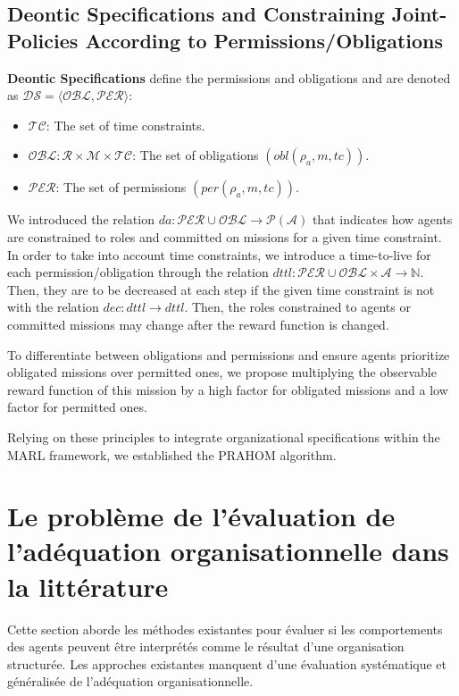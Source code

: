 \documentclass[sigconf,anonymous]{aamas}
\begin{document}
\subsection{Deontic Specifications and Constraining Joint-Policies According to Permissions/Obligations}

\textbf{Deontic Specifications} define the permissions and obligations and are denoted as $\mathcal{DS} = \langle \mathcal{OBL}, \mathcal{PER} \rangle$:

\begin{itemize}
    \item $\mathcal{TC}$: The set of time constraints.
    \item $\mathcal{OBL}: \mathcal{R} \times \mathcal{M} \times \mathcal{TC}$: The set of obligations $(obl(\rho_a, m, tc))$.
    \item $\mathcal{PER}$: The set of permissions $(per(\rho_a, m, tc))$.
\end{itemize}

We introduced the relation $da: \mathcal{PER} \cup \mathcal{OBL} \rightarrow \mathcal{P}(\mathcal{A})$ that indicates how agents are constrained to roles and committed on missions for a given time constraint. In order to take into account time constraints, we introduce a time-to-live for each permission/obligation through the relation $dttl: \mathcal{PER} \cup \mathcal{OBL} \times \mathcal{A} \rightarrow \mathbb{N}$. Then, they are to be decreased at each step if the given time constraint is not  with the relation $dec: dttl \rightarrow dttl$. Then, the roles constrained to agents or committed missions may change after the reward function is changed.

To differentiate between obligations and permissions and ensure agents prioritize obligated missions over permitted ones, we propose multiplying the observable reward function of this mission by a high factor for obligated missions and a low factor for permitted ones.

Relying on these principles to integrate organizational specifications within the MARL framework, we established the PRAHOM algorithm.

\section{Le problème de l'évaluation de l'adéquation organisationnelle dans la littérature}
\label{sec:evaluation_problem}

Cette section aborde les méthodes existantes pour évaluer si les comportements des agents peuvent être interprétés comme le résultat d'une organisation structurée. Les approches existantes manquent d'une évaluation systématique et généralisée de l'adéquation organisationnelle.
\end{document}
